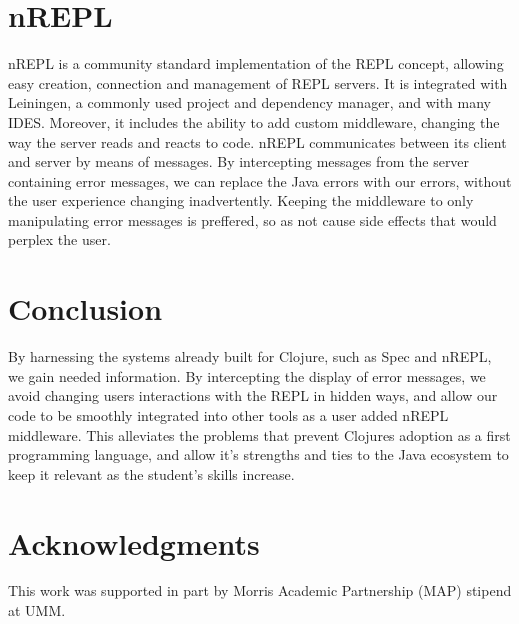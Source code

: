 \documentclass[12pt]{article}
\begin{document}
\section{nREPL}
nREPL is a community standard implementation of the REPL concept,
allowing easy creation, connection and management of REPL servers.
It is integrated with Leiningen, a commonly used project and dependency manager,
 and with many IDES. Moreover, it includes the ability to add custom middleware,
  changing the way the server reads and reacts to code.
 nREPL communicates between its client and server by means of messages.
 By intercepting messages from the server containing error messages,
 we can replace the Java errors with our errors,
  without the user experience changing inadvertently.
  Keeping the middleware to only manipulating error messages
  is preffered, so as not cause side effects that would perplex the user.

\section{Conclusion}
By harnessing the systems already built for Clojure,
such as Spec and nREPL, we gain needed information.
By intercepting the display of error messages, we avoid changing users
interactions with the REPL in hidden ways, and allow our code to
be smoothly integrated into other tools as a user added nREPL middleware.
  This alleviates the problems that prevent Clojures
 adoption as a first programming language, and allow it's strengths
 and ties to the Java ecosystem to keep it relevant as the student's skills increase.





\section{Acknowledgments}
This work was supported in part by Morris Academic Partnership (MAP) stipend at UMM.




\end{document}
